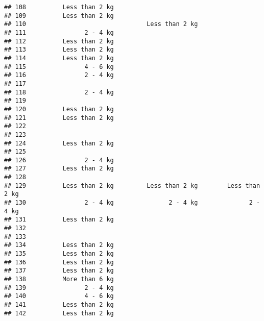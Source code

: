 \documentclass[
]{article}
\begin{document}
\begin{verbatim}
## 108          Less than 2 kg                                             
## 109          Less than 2 kg                                             
## 110                                 Less than 2 kg                      
## 111                2 - 4 kg                                             
## 112          Less than 2 kg                                             
## 113          Less than 2 kg                                             
## 114          Less than 2 kg                                             
## 115                4 - 6 kg                                             
## 116                2 - 4 kg                                             
## 117                                                                     
## 118                2 - 4 kg                                             
## 119                                                                     
## 120          Less than 2 kg                                             
## 121          Less than 2 kg                                             
## 122                                                                     
## 123                                                                     
## 124          Less than 2 kg                                             
## 125                                                                     
## 126                2 - 4 kg                                             
## 127          Less than 2 kg                                             
## 128                                                                     
## 129          Less than 2 kg         Less than 2 kg        Less than 2 kg
## 130                2 - 4 kg               2 - 4 kg              2 - 4 kg
## 131          Less than 2 kg                                             
## 132                                                                     
## 133                                                                     
## 134          Less than 2 kg                                             
## 135          Less than 2 kg                                             
## 136          Less than 2 kg                                             
## 137          Less than 2 kg                                             
## 138          More than 6 kg                                             
## 139                2 - 4 kg                                             
## 140                4 - 6 kg                                             
## 141          Less than 2 kg                                             
## 142          Less than 2 kg                                             

\end{verbatim}
\end{document}
